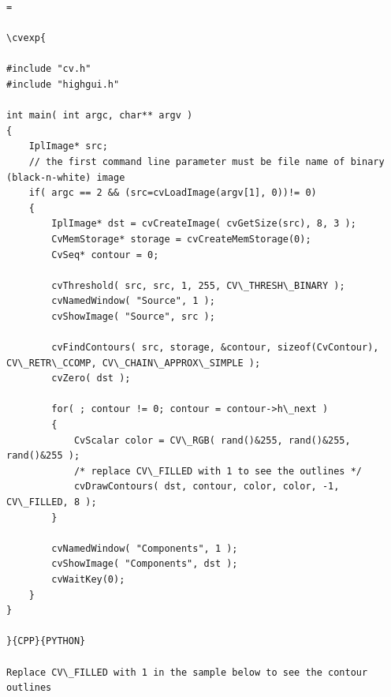 \begin{verbatim}=

\cvexp{

#include "cv.h"
#include "highgui.h"

int main( int argc, char** argv )
{
    IplImage* src;
    // the first command line parameter must be file name of binary (black-n-white) image
    if( argc == 2 && (src=cvLoadImage(argv[1], 0))!= 0)
    {
        IplImage* dst = cvCreateImage( cvGetSize(src), 8, 3 );
        CvMemStorage* storage = cvCreateMemStorage(0);
        CvSeq* contour = 0;

        cvThreshold( src, src, 1, 255, CV\_THRESH\_BINARY );
        cvNamedWindow( "Source", 1 );
        cvShowImage( "Source", src );

        cvFindContours( src, storage, &contour, sizeof(CvContour), CV\_RETR\_CCOMP, CV\_CHAIN\_APPROX\_SIMPLE );
        cvZero( dst );

        for( ; contour != 0; contour = contour->h\_next )
        {
            CvScalar color = CV\_RGB( rand()&255, rand()&255, rand()&255 );
            /* replace CV\_FILLED with 1 to see the outlines */
            cvDrawContours( dst, contour, color, color, -1, CV\_FILLED, 8 );
        }

        cvNamedWindow( "Components", 1 );
        cvShowImage( "Components", dst );
        cvWaitKey(0);
    }
}

}{CPP}{PYTHON}

Replace CV\_FILLED with 1 in the sample below to see the contour outlines


\end{verbatim}
\label{InitLineIterator}
